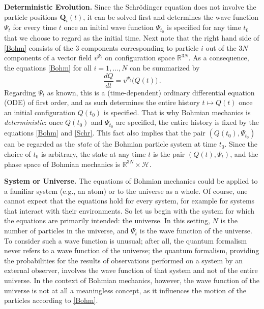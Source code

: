 \documentclass[12pt]{report}
\newcommand{\Hilbert}{\mathscr{H}}
\newcommand{\RRR}{\mathbb{R}}
\newcommand{\vQ}{\boldsymbol{Q}}
\begin{document}

\bigskip

\noindent\textbf{Deterministic Evolution.}
Since the Schr\"odinger equation does not involve the particle positions $\vQ_i(t)$, it can be solved first and determines the wave function $\Psi_t$ for every time $t$ once an initial wave function $\Psi_{t_0}$ is specified for any time $t_0$ that we choose to regard as the initial time. Next note that the right hand side of \eqref{Bohm} consists of the  3 components corresponding to particle $i$ out of the $3N$ components of a vector field $v^{\Psi_t}$ on configuration space $\RRR^{3N}$. As a consequence, the equations \eqref{Bohm} for all $i=1,\ldots,N$ can be summarized by
\begin{equation}\label{v}
\frac{dQ}{dt} = v^{\Psi_t}\bigl(Q(t)\bigr)\,.
\end{equation}
Regarding $\Psi_t$ as known, this is a (time-dependent) ordinary differential equation (ODE) of first order, and as such determines the entire history $t\mapsto Q(t)$ once an initial configuration $Q(t_0)$ is specified. That is why Bohmian mechanics is \emph{deterministic}: once $Q(t_0)$ and $\Psi_{t_0}$ are specified, the entire history is fixed by the equations \eqref{Bohm} and \eqref{Schr}. This fact also implies that the pair $(Q(t_0), \Psi_{t_0})$ can be regarded as the \emph{state} of the Bohmian particle system at time $t_0$. Since the choice of $t_0$ is arbitrary, the state at any time $t$ is the pair $(Q(t),\Psi_t)$, and the phase space of Bohmian mechanics is $\RRR^{3N} \times \Hilbert$.

\bigskip

\noindent\textbf{System or Universe.}
The equations of Bohmian mechanics could be applied to a familiar system (e.g., an atom) or to the universe as a whole. Of course, one cannot expect that the equations hold for every system, for example for systems that interact with their environments. So let us begin with the system for which the equations are primarily intended: the universe. In this setting, $N$ is the number of particles in the universe, and $\Psi_t$ is the wave function of the universe. To consider such a wave function is unusual; after all, the quantum formalism never refers to a wave function of the universe; the quantum formalism, providing the probabilities for the results of observations performed on a system by an external observer, involves the wave function of that system and not of the entire universe. In the context of Bohmian mechanics, however, the wave function of the universe is not at all a meaningless concept, as it influences the motion of the particles according to \eqref{Bohm}. 
\end{document}
